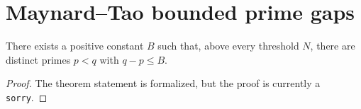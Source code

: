 \section{Maynard--Tao bounded prime gaps}

\begin{theorem}
\label{thm:maynard-tao}
\notready
There exists a positive constant $B$ such that, above every threshold $N$, there are distinct primes $p<q$ with $q-p\le B$.
\end{theorem}

\begin{proof}
The theorem statement is formalized, but the proof is currently a \texttt{sorry}.
\end{proof}
